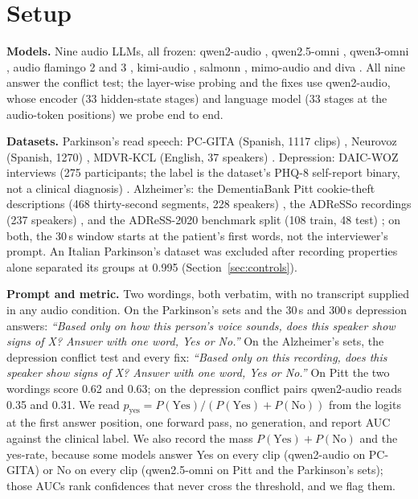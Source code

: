 \documentclass[conference]{IEEEtran}
\begin{document}
\section{Setup}\label{sec:setup}

\noindent\textbf{Models.} Nine audio LLMs, all frozen: qwen2-audio \cite{qwen2audio},
qwen2.5-omni \cite{qwen25omni}, qwen3-omni \cite{qwen3omni}, audio flamingo 2 and 3
\cite{af2,af3}, kimi-audio \cite{kimiaudio}, salmonn \cite{salmonn}, mimo-audio
\cite{mimoaudio} and diva \cite{diva}. All nine answer the conflict test; the layer-wise probing and
the fixes use qwen2-audio, whose encoder (33 hidden-state stages) and language model (33 stages at
the audio-token positions) we probe end to end.

\noindent\textbf{Datasets.} Parkinson's read speech: PC-GITA (Spanish, 1117 clips)
\cite{pcgita}, Neurovoz (Spanish, 1270) \cite{neurovoz}, MDVR-KCL (English, 37 speakers)
\cite{kcl}. Depression: DAIC-WOZ interviews (275 participants; the label is the dataset's PHQ-8
self-report binary, not a clinical diagnosis) \cite{daic}. Alzheimer's: the
DementiaBank Pitt cookie-theft descriptions (468 thirty-second segments, 228 speakers)
\cite{pitt,dementiabank}, the ADReSSo recordings (237 speakers) \cite{adresso}, and the ADReSS-2020
benchmark split (108 train, 48 test) \cite{adress2020}; on both, the 30\,s window starts at the
patient's first words, not the interviewer's prompt. An Italian Parkinson's dataset was excluded
after recording properties alone separated its groups at 0.995 (Section~\ref{sec:controls}).

\noindent\textbf{Prompt and metric.} Two wordings, both verbatim, with no transcript supplied in any
audio condition. On the Parkinson's sets and the 30\,s and 300\,s depression answers: \emph{``Based
only on how this person's voice sounds, does this speaker show signs of X? Answer with one word, Yes or
No.''} On the Alzheimer's sets, the depression conflict test and every fix: \emph{``Based only on this
recording, does this speaker show signs of X? Answer with one word, Yes or No.''} On Pitt the two
wordings score 0.62 and 0.63; on the depression conflict pairs qwen2-audio reads 0.35 and 0.31. We read $p_{\text{yes}} = P(\text{Yes})/(P(\text{Yes})+P(\text{No}))$ from the logits
at the first answer position, one forward pass, no generation, and report AUC against the clinical
label. We also record the mass $P(\text{Yes})+P(\text{No})$ and the yes-rate, because some models
answer Yes on every clip (qwen2-audio on PC-GITA) or No on every clip (qwen2.5-omni on Pitt and the Parkinson's sets); those AUCs
rank confidences that never cross the threshold, and we flag them.
\end{document}
